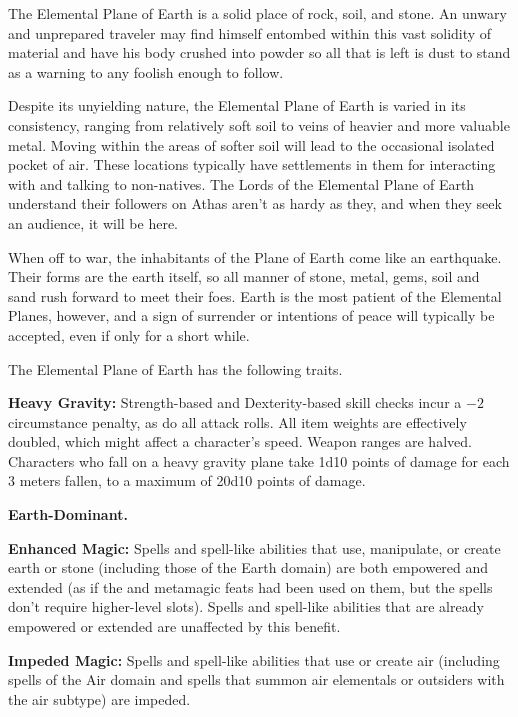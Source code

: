 The Elemental Plane of Earth is a solid place of rock, soil, and stone. An unwary and unprepared traveler may find himself entombed within this vast solidity of material and have his body crushed into powder so all that is left is dust to stand as a warning to any foolish enough to follow.

Despite its unyielding nature, the Elemental Plane of Earth is varied in its consistency, ranging from relatively soft soil to veins of heavier and more valuable metal. Moving within the areas of softer soil will lead to the occasional isolated pocket of air. These locations typically have settlements in them for interacting with and talking to non-natives. The Lords of the Elemental Plane of Earth understand their followers on Athas aren't as hardy as they, and when they seek an audience, it will be here.

When off to war, the inhabitants of the Plane of Earth come like an earthquake. Their forms are the earth itself, so all manner of stone, metal, gems, soil and sand rush forward to meet their foes. Earth is the most patient of the Elemental Planes, however, and a sign of surrender or intentions of peace will typically be accepted, even if only for a short while.

The Elemental Plane of Earth has the following traits.
\begin{itemize*}
\item \textbf{Heavy Gravity:} Strength-based and Dexterity-based skill checks incur a $-2$ circumstance penalty, as do all attack rolls. All item weights are effectively doubled, which might affect a character's speed. Weapon ranges are halved. Characters who fall on a heavy gravity plane take 1d10 points of damage for each 3 meters fallen, to a maximum of 20d10 points of damage.
\item \textbf{Earth-Dominant.}
\item \textbf{Enhanced Magic:} Spells and spell-like abilities that use, manipulate, or create earth or stone (including those of the Earth domain) are both empowered and extended (as if the  and  metamagic feats had been used on them, but the spells don't require higher-level slots). Spells and spell-like abilities that are already empowered or extended are unaffected by this benefit.
\item \textbf{Impeded Magic:} Spells and spell-like abilities that use or create air (including spells of the Air domain and spells that summon air elementals or outsiders with the air subtype) are impeded.
\end{itemize*}
